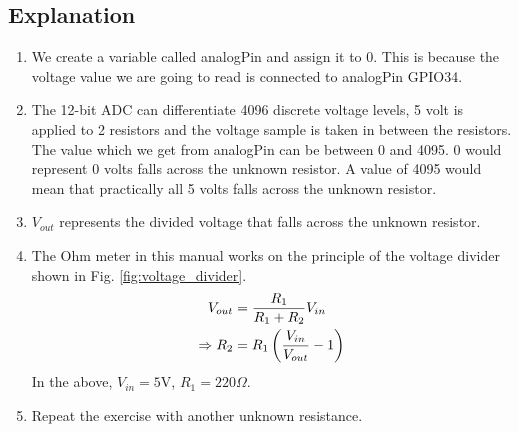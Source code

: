 \subsection{Explanation}
\begin{enumerate}[label=\thesection.\arabic*.,ref=\thesection.\theenumi]

\item We create a variable called analogPin and assign it to 0. This is because 
the voltage value we are going to read is connected to analogPin GPIO34.

\item  The 12-bit ADC can differentiate 4096 discrete voltage levels, 5 volt is 
applied to 2 resistors and the voltage sample is taken in between the resistors.
The value which we get from analogPin can be between 0 and 4095. 0 would 
represent 0 volts falls across the unknown resistor. A value of 4095 would mean 
that practically all 5 volts falls across the unknown resistor.

\item  $V_{out}$ represents the divided voltage that falls across the unknown 
resistor.

\item  The Ohm meter in this manual works on the principle of the voltage 
divider shown in Fig. \ref{fig:voltage_divider}.
%
\begin{align}
V_{out}&=\frac{R_1}{R_1+R_2}V_{in} \\
\Rightarrow R_2&=R_1\left(\frac{V_{in}}{V_{out}}-1\right)
\end{align}
%
In the above, $V_{in} = 5$V, $R_1 = 220 \Omega$.
\item Repeat the exercise with another unknown resistance.
\end{enumerate}

